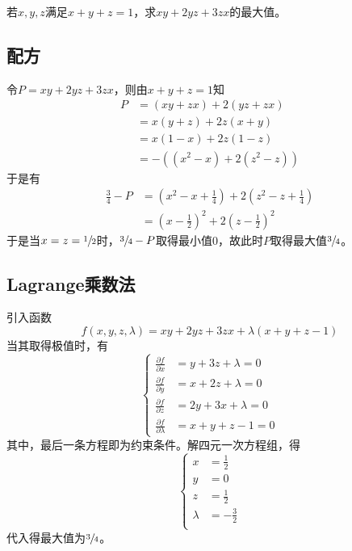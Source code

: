 

若$x, y, z$满足$x + y + z = 1$，求$xy + 2yz + 3zx$的最大值。


\subsection{配方}

令$P = xy + 2yz + 3zx$，则由$x + y + z = 1$知
\begin{align*}
  P &= (xy + zx) + 2(yz + zx) \\
  &= x(y + z) + 2z(x + y) \\
  &= x(1 - x) + 2z(1 - z) \\
  &= -\left(\left(x^2 - x\right) + 2\left(z^2 - z\right)\right)
\end{align*}
于是有
\begin{align*}
  \frac34 - P &= \left(x^2 - x + \frac14\right) + 2\left(z^2 - z + \frac14\right) \\
  &= \left(x - \frac12\right)^2 + 2\left(z - \frac12\right)^2
\end{align*}
于是当$x = z = \sfrac12$时，$\sfrac34 - P$取得最小值0，故此时$P$取得最大值$\sfrac34$。

\subsection{Lagrange乘数法}

引入函数
\[ f(x, y, z, \lambda) = xy + 2yz + 3zx + \lambda(x + y + z - 1) \]
当其取得极值时，有
\[ \left\{ \begin{aligned}
  \frac{\partial f}{\partial x} &= y + 3z + \lambda = 0 \\
  \frac{\partial f}{\partial y} &= x + 2z + \lambda = 0 \\
  \frac{\partial f}{\partial z} &= 2y + 3x + \lambda = 0 \\
  \frac{\partial f}{\partial \lambda} &= x + y + z - 1 = 0
\end{aligned} \right. \]
其中，最后一条方程即为约束条件。解四元一次方程组，得
\[ \left\{ \begin{aligned}
  x &= \frac12 \\
  y &= 0 \\
  z &= \frac12 \\
  \lambda &= -\frac32 \\
\end{aligned} \right. \]
代入得最大值为$\sfrac34$。
